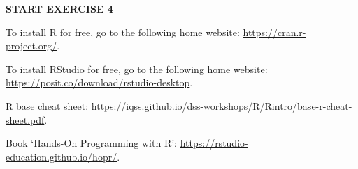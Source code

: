 \documentclass[
]{book}
\begin{document}
\textbf{START EXERCISE 4}

To install R for free, go to the following home website: \url{https://cran.r-project.org/}.

To install RStudio for free, go to the following home website: \url{https://posit.co/download/rstudio-desktop}.

R base cheat sheet: \url{https://iqss.github.io/dss-workshops/R/Rintro/base-r-cheat-sheet.pdf}.

Book `Hands-On Programming with R': \url{https://rstudio-education.github.io/hopr/}.


\end{document}
